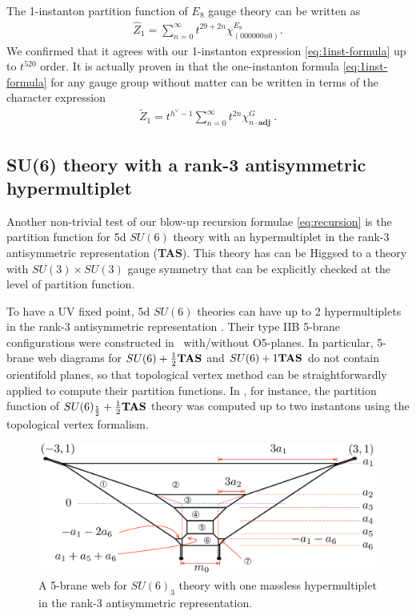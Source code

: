 \documentclass[letterpaper, 11pt]{article}
\begin{document}
{The 1-instanton partition function of $E_8$ gauge theory can be written as 
\begin{align}
    \label{eq:E8}
  \hat{Z}_1=\sum_{n=0}^{\infty}t^{29+2n}\chi^{E_8}_{(000000n0)}.
\end{align}
We confirmed that it agrees with our 1-instanton expression \eqref{eq:1inst-formula} up to $t^{520}$ order. 
It is actually proven in \cite{Keller:2011ek, Keller:2012da} that the one-instanton formula \eqref{eq:1inst-formula} for any gauge group without matter can be written in terms of the character expression \cite{VinbergPopov, Garfinkle, Benvenuti:2010pq}
\begin{align}
 \tilde{Z}_1 = t^{h^\vee - 1} \sum_{n=0}^\infty t^{2n} \chi^G_{n \cdot \textbf{adj}} \ . 
\end{align}


\subsection{SU(6) theory with a rank-3 antisymmetric hypermultiplet}
\label{subsec:rank3}
Another non-trivial test of our blow-up recursion formulae \eqref{eq:recursion}  is the partition function for 5d $SU(6)$ theory with an hypermultiplet in the rank-3 antisymmetric representation ({\bf TAS}). This theory has can be Higgsed to a theory with $SU(3)\times SU(3)$ gauge symmetry that can be explicitly checked at the level of partition function.

To have a UV fixed point, 5d $SU(6)$ theories can have up to 2 hypermultiplets in the rank-3 antisymmetric representation \cite{Jefferson:2017ahm}. Their type IIB 5-brane configurations were constructed in~\cite{Hayashi:2019yxj} with/without O5-planes. In particular, 5-brane web diagrams for $SU(6)+\frac12{\bf TAS}$ and $SU(6)+1{\bf TAS}$ do not contain orientifold planes, so that topological vertex method \cite{Aganagic:2003db, Iqbal:2007ii} can be straightforwardly applied to compute their partition functions. In \cite{Hayashi:2019yxj},  for instance, the partition function of $SU(6)_\frac52 + \frac12{\bf TAS}$ theory was computed up to two instantons using the topological vertex formalism.
\begin{figure}[t]
\centering
\includegraphics[width=12cm]{SU6-monopole.pdf}
\caption{A 5-brane web for $SU(6)_3$ theory with one massless hypermultiplet in the rank-3 antisymmetric representation.}
\label{fig:SU6-monopole}
\end{figure}

}
\end{document}
